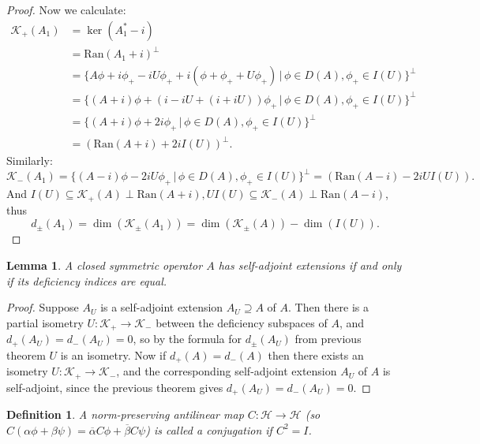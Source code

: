\documentclass[12pt,oneside]{report}
\newtheorem{lem}[thm]{Lemma}
\newtheorem{defn}[thm]{Definition}
\begin{document}
\begin{proof}
    Now we calculate: \begin{align*}
        \mathscr{K}_{+}(A_{1}) &= \ker(A_{1}^{*} - i)  \\
        &= \text{Ran}(A_{1} + i)^{\perp}  \\
        &= \{ A\phi + i\phi_{+} - iU\phi_{+} + i(\phi + \phi_{+} + U\phi_{+}) \, | \, \phi \in D(A), \phi_{+} \in I(U) \}^{\perp}  \\
        &= \{ (A + i)\phi + (i - iU + (i + iU))\phi_{+} \, | \, \phi \in D(A), \phi_{+} \in I(U) \}^{\perp} \\
        &= \{ (A + i)\phi + 2i\phi_{+} \, | \, \phi \in D(A), \phi_{+} \in I(U) \}^{\perp} \\
        &= (\text{Ran}(A+i) + 2iI(U))^{\perp}.
    \end{align*}
Similarly: $$\mathscr{K}_{-}(A_{1}) = \{ (A - i)\phi - 2iU\phi_{+} \, | \, \phi \in D(A), \phi_{+} \in I(U) \}^{\perp} = (\text{Ran}(A - i) - 2iUI(U)).$$ And $I(U) \subseteq \mathscr{K}_{+}(A) \perp \text{Ran}(A+i), UI(U) \subseteq \mathscr{K}_{-}(A) \perp \text{Ran}(A - i)$, thus $$d_{\pm}(A_{1}) = \dim(\mathscr{K}_{\pm}(A_{1})) = \dim(\mathscr{K}_{\pm}(A)) - \dim(I(U)).$$
\end{proof}

\begin{lem}
    A closed symmetric operator $A$ has self-adjoint extensions if and only if its deficiency indices are equal.
\end{lem}
\begin{proof}
    Suppose $A_{U}$ is a self-adjoint extension $A_{U} \supseteq A$ of $A$. Then there is a partial isometry $U: \mathscr{K}_{+} \to \mathscr{K}_{-}$ between the deficiency subspaces of $A$, and $d_{+}(A_{U}) = d_{-}(A_{U}) = 0$, so by the formula for $d_{\pm}(A_{U})$ from previous theorem $U$ is an isometry. Now if $d_{+}(A) = d_{-}(A)$ then there exists an isometry $U: \mathscr{K}_{+} \to \mathscr{K}_{-}$, and the corresponding self-adjoint extension $A_{U}$ of $A$ is self-adjoint, since the previous theorem gives $d_{+}(A_{U}) = d_{-}(A_{U}) = 0$.
\end{proof}

\begin{defn}
    A norm-preserving antilinear map $C: \mathscr{H} \to \mathscr{H}$ (so $C(\alpha \phi + \beta \psi) = \overline{\alpha}C\phi + \overline{\beta}C\psi$) is called a conjugation if $C^{2} = I$.
\end{defn}
\end{document}
